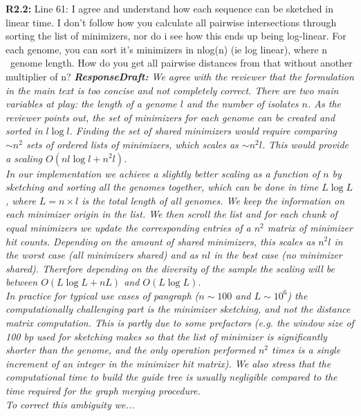 \documentclass[aps,rmp,onecolumn]{revtex4-1}
\newcommand{\Marco}[1]{{\color{gray}Marco: #1}}
\newcommand{\Liam}[1]{{\color{teal}Liam: #1}}
\newcommand{\reviewer}[2]{\textbf{#1:} #2\vskip 5mm}
\newcommand{\responsedraft}[1]{{\it {\color{purple}\textbf{ResponseDraft:} #1}}\vskip 5mm}
\begin{document}
\reviewer{R2.2}{Line 61: I agree and understand how each sequence can be sketched in linear time. I don't follow how you calculate all pairwise intersections through sorting the list of minimizers, nor do i see how this ends up being log-linear. For each genome, you can sort it's minimizers in nlog(n) (ie log linear), where n ~genome length. How do you get all pairwise distances from that without another multiplier of n?}
\responsedraft{We agree with the reviewer that the formulation in the main text is too concise and not completely correct. There are two main variables at play: the length of a genome $l$ and the number of isolates $n$. As the reviewer points out, the set of minimizers for each genome can be created and sorted in $l \log l$. Finding the set of shared minimizers would require comparing $\sim n^2$ sets of ordered lists of minimizers, which scales as $\sim n^2 l$. This would provide a scaling $O(n l \log l + n^2 l)$.\\
      In our implementation we achieve a slightly better scaling as a function of $n$ by sketching and sorting all the genomes together, which can be done in time $L \log L$, where $L= n \times l$ is the total length of all genomes. We keep the information on each minimizer origin in the list. We then scroll the list and for each chunk of equal minimizers we update the corresponding entries of a $n^2$ matrix of minimizer hit counts. Depending on the amount of shared minimizers, this scales as $n^2 l$ in the worst case (all minimizers shared) and as $n l$ in the best case (no minimizer shared). Therefore depending on the diversity of the sample the scaling will be between $O(L \log L + n L)$ and $O(L \log L)$.\\
      In practice for typical use cases of pangraph ($n \sim 100$ and $L \sim 10^6$) the computationally challenging part is the minimizer sketching, and not the distance matrix computation. This is partly due to some prefactors (e.g. the window size of 100 bp used for sketching makes so that the list of minimizer is significantly shorter than the genome, and the only operation performed $n^2$ times is a single increment of an integer in the minimizer hit matrix). We also stress that the computational time to build the guide tree is usually negligible compared to the time required for the graph merging procedure.\\
      To correct this ambiguity we...
}
\end{document}
